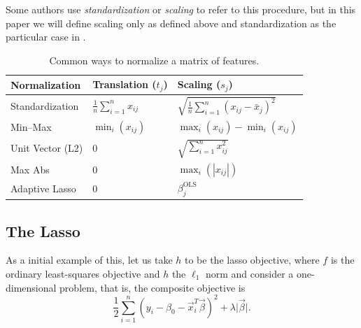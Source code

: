 Some authors use \emph{standardization} or \emph{scaling} to refer to this procedure, but in this paper we will define scaling only as defined above and standardization as the particular case in .

\begin{table}[hbt]
  \centering
  \caption{Common ways to normalize a matrix of features.}
  \label{tab:normalization-types}
  \begin{tabular}{lll}
    \toprule
    Normalization    & Translation (\(t_j\))              & Scaling (\(s_j\))                                         \\
    \midrule
    Standardization  & \(\frac{1}{n}\sum_{i=1}^n x_{ij}\) & \(\sqrt{\frac{1}{n}\sum_{i=1}^n (x_{ij} - \bar{x}_j)^2}\) \\
    \addlinespace
    Min--Max         & \(\min_i(x_{ij})\)                 & \(\max_i(x_{ij}) - \min_i(x_{ij})\)                       \\
    \addlinespace
    Unit Vector (L2) & 0                                  & \(\sqrt{\sum_{i=1}^n x_{ij}^2}\)                          \\
    \addlinespace
    Max Abs          & 0                                  & \(\max_i(|x_{ij}|)\)                                      \\
    \addlinespace
    Adaptive Lasso   & 0                                  & \(\beta_j^\text{OLS}\)                                    \\
    \bottomrule
  \end{tabular}
\end{table}

\subsection{The Lasso}

As a initial example of this, let us take \(h\) to be the lasso objective, where \(f\) is the ordinary least-squares objective and \(h\) the \(\ell_1\) norm and consider a one-dimensional problem, that is, the composite objective is
\[
  \frac{1}{2} \sum_{i=1}^n(y_i - \beta_0 - \vec{x}^T_i \vec\beta)^2 + \lambda \lvert \vec\beta \rvert.
\]

